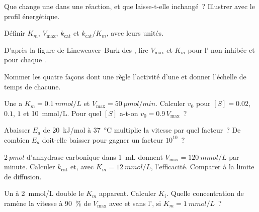 \begin{exercise}[$\star$]\label{exo:b1:enzymes:1}
Que change une  dans une réaction, et que laisse-t-elle
inchangé~? Illustrer avec le profil énergétique.
\end{exercise}

\begin{exercise}[$\star$]\label{exo:b1:enzymes:2}
Définir $K_m$, $V_{\max}$, $k_{\text{cat}}$ et $k_{\text{cat}}/K_m$,
avec leurs unités.
\end{exercise}

\begin{exercise}[$\star$]\label{exo:b1:enzymes:3}
D'après la figure de Lineweaver--Burk des , lire $V_{\max}$
et $K_m$ pour l' non inhibée et pour chaque .
\end{exercise}

\begin{exercise}[$\star$]\label{exo:b1:enzymes:4}
Nommer les quatre façons dont une  règle l'activité d'une 
et donner l'échelle de temps de chacune.
\end{exercise}

\begin{exercise}[$\star\star$]\label{exo:b1:enzymes:5}
Une  a $K_m = \qty{0.1}{mmol/L}$ et $V_{\max} =
\qty{50}{\micro mol/min}$. Calculer $v_0$ pour $[S] = 0.02$, $0.1$, $1$
et \qty{10}{mmol/L}. Pour quel $[S]$ a-t-on $v_0 = 0.9\,V_{\max}$~?
\end{exercise}

\begin{exercise}[$\star\star$]\label{exo:b1:enzymes:6}
Abaisser $E_a$ de \qty{20}{kJ/mol} à \qty{37}{\celsius} multiplie la
vitesse par quel facteur~? De combien $E_a$ doit-elle baisser pour
gagner un facteur $10^{10}$~?
\end{exercise}

\begin{exercise}[$\star\star$]\label{exo:b1:enzymes:7}
$\qty{2}{pmol}$ d'anhydrase carbonique dans \qty{1}{mL} donnent
$V_{\max} = \qty{120}{mmol/L}$ par minute. Calculer $k_{\text{cat}}$
et, avec $K_m = \qty{12}{mmol/L}$, l'efficacité. Comparer à la limite de
diffusion.
\end{exercise}

\begin{exercise}[$\star\star$]\label{exo:b1:enzymes:8}
Un   à \qty{2}{mmol/L} double le $K_m$ apparent.
Calculer $K_i$. Quelle concentration de  ramène la vitesse à
\qty{90}{\%} de $V_{\max}$ avec et sans l', si
$K_m = \qty{1}{mmol/L}$~?
\end{exercise}

